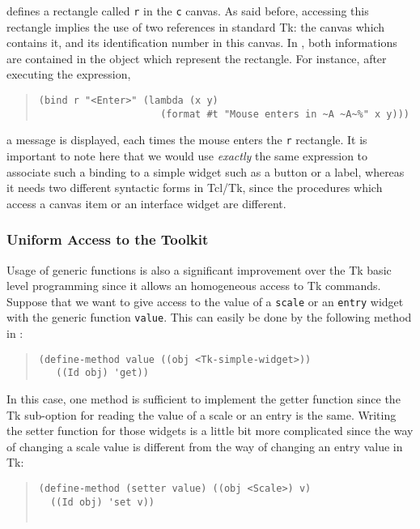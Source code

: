 {\noindent
defines a rectangle called {\tt r} in the {\tt c} canvas. As said
before, accessing this rectangle implies the use of two references in
standard Tk: the canvas which contains it, and its identification
number in this canvas. In {\stklos}, both informations are contained in the object
which represent the rectangle. For instance, after executing the expression,
\begin{quote}\figsize
\begin{verbatim}
(bind r "<Enter>" (lambda (x y) 
                     (format #t "Mouse enters in ~A ~A~%" x y)))
\end{verbatim}
\end{quote}

\noindent
a message is displayed, each times the mouse enters the {\tt r}
rectangle. It is important to note here that we would use {\em
exactly} the same expression to associate such a binding to a simple
widget such as a button or a label, whereas it needs two different
syntactic forms in Tcl/Tk, since the procedures which access
a canvas item or an interface widget are different.

\subsubsection{Uniform Access to the Toolkit}
Usage of generic functions is also a significant improvement over the
Tk basic level programming since it allows an homogeneous access to
Tk commands. Suppose that we want to give access to
the value of a {\tt scale} or an {\tt entry} widget with the generic
function {\tt value}. This can easily be done by the following method
in {\stklos}:

\begin{quote}\figsize
\begin{verbatim}
(define-method value ((obj <Tk-simple-widget>))
   ((Id obj) 'get))
\end{verbatim}
\end{quote}

In this case, one method is sufficient to implement the getter
function since the Tk sub-option for reading the value of a scale or
an entry is the same. Writing the setter function for those widgets is
a little bit more complicated since the way of changing a scale value
is different from the way of changing an entry value in Tk:

\begin{quote}\figsize
\begin{verbatim}
(define-method (setter value) ((obj <Scale>) v)
  ((Id obj) 'set v))


\end{verbatim}
\end{quote}}

